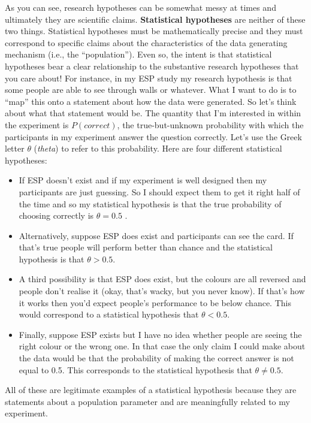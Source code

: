 \documentclass[
  a4paper,
]{book}
\providecommand{\tightlist}{%
  \setlength{\itemsep}{0pt}\setlength{\parskip}{0pt}}\usepackage{longtable,booktabs,array}
\begin{document}
As you can see, research hypotheses can be somewhat messy at times and
ultimately they are scientific claims. \textbf{Statistical hypotheses}
are neither of these two things. Statistical hypotheses must be
mathematically precise and they must correspond to specific claims about
the characteristics of the data generating mechanism (i.e., the
``population''). Even so, the intent is that statistical hypotheses bear
a clear relationship to the substantive research hypotheses that you
care about! For instance, in my ESP study my research hypothesis is that
some people are able to see through walls or whatever. What I want to do
is to ``map'' this onto a statement about how the data were generated.
So let's think about what that statement would be. The quantity that I'm
interested in within the experiment is \(P(correct)\), the
true-but-unknown probability with which the participants in my
experiment answer the question correctly. Let's use the Greek letter
\(\theta\) (\emph{theta}) to refer to this probability. Here are four
different statistical hypotheses:

\begin{itemize}
\tightlist
\item
  If ESP doesn't exist and if my experiment is well designed then my
  participants are just guessing. So I should expect them to get it
  right half of the time and so my statistical hypothesis is that the
  true probability of choosing correctly is \(\theta=0.5\) .
\item
  Alternatively, suppose ESP does exist and participants can see the
  card. If that's true people will perform better than chance and the
  statistical hypothesis is that \(\theta > 0.5\).
\item
  A third possibility is that ESP does exist, but the colours are all
  reversed and people don't realise it (okay, that's wacky, but you
  never know). If that's how it works then you'd expect people's
  performance to be below chance. This would correspond to a statistical
  hypothesis that \(\theta < 0.5\).
\item
  Finally, suppose ESP exists but I have no idea whether people are
  seeing the right colour or the wrong one. In that case the only claim
  I could make about the data would be that the probability of making
  the correct answer is not equal to 0.5. This corresponds to the
  statistical hypothesis that \(\theta \neq 0.5\).
\end{itemize}

All of these are legitimate examples of a statistical hypothesis because
they are statements about a population parameter and are meaningfully
related to my experiment.
\end{document}
